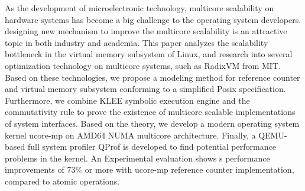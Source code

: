 
\begin{eabstract} 
	
	As the development of microelectronic technology, multicore scalability on hardware systems has become a big challenge to the operating system developers.  designing new mechanism to improve the multicore scalability is an attractive topic in both industry and academia.
	This paper analyzes the scalability bottleneck in the virtual memory subsystem of Linux, and research into several optimization technology on multicore 
	systems, such as RadixVM from MIT. Based on these technologies, we propose a modeling method for reference counter and
	virtual memory subsystem conforming to a simplified Posix specification.  Furthermore, we combine KLEE symbolic execution engine and the commutativity rule 
	to prove the existence of multicore scalable implementations of system interfaces. Based on the theory, we develop a modern operating system kernel ucore-mp on
	AMD64 NUMA multicore  architecture. Finally, a QEMU-based full system profiler QProf is developed to find potential performance problems in the kernel. An Experimental evaluation shows s performance improvements of 73\% or more with ucore-mp reference counter implementation, compared to atomic operations.
\end{eabstract}


